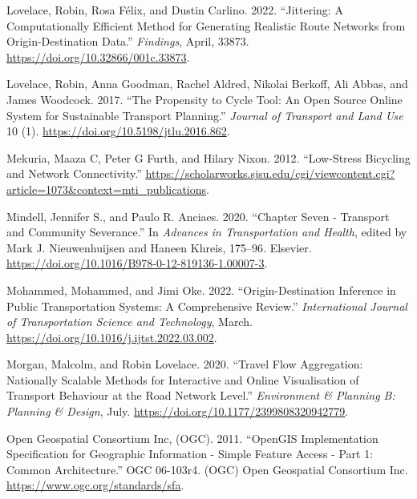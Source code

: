 \documentclass{isprs} %
\newlength{\cslhangindent}
\newlength{\cslentryspacingunit} %
\newenvironment{CSLReferences}[2] %
 {%
  \setlength{\parindent}{0pt}
  \ifodd #1
  \let\oldpar\par
  \def\par{\hangindent=\cslhangindent\oldpar}
  \fi
  \setlength{\parskip}{#2\cslentryspacingunit}
 }%
 {}
\begin{document}
\begin{CSLReferences}{1}{0}
\leavevmode{}%
Lovelace, Robin, Rosa Félix, and Dustin Carlino. 2022. {``Jittering: {A Computationally Efficient Method} for {Generating Realistic Route Networks} from {Origin-Destination Data}.''} \emph{Findings}, April, 33873. \url{https://doi.org/10.32866/001c.33873}.

\leavevmode{}%
Lovelace, Robin, Anna Goodman, Rachel Aldred, Nikolai Berkoff, Ali Abbas, and James Woodcock. 2017. {``The {Propensity} to {Cycle Tool}: {An} Open Source Online System for Sustainable Transport Planning.''} \emph{Journal of Transport and Land Use} 10 (1). \url{https://doi.org/10.5198/jtlu.2016.862}.

\leavevmode{}%
Mekuria, Maaza C, Peter G Furth, and Hilary Nixon. 2012. {``Low-Stress Bicycling and Network Connectivity.''} \url{https://scholarworks.sjsu.edu/cgi/viewcontent.cgi?article=1073\&context=mti_publications}.

\leavevmode{}%
Mindell, Jennifer S., and Paulo R. Anciaes. 2020. {``Chapter Seven - {Transport} and Community Severance.''} In \emph{Advances in {Transportation} and {Health}}, edited by Mark J. Nieuwenhuijsen and Haneen Khreis, 175--96. {Elsevier}. \url{https://doi.org/10.1016/B978-0-12-819136-1.00007-3}.

\leavevmode{}%
Mohammed, Mohammed, and Jimi Oke. 2022. {``Origin-Destination Inference in Public Transportation Systems: {A} Comprehensive Review.''} \emph{International Journal of Transportation Science and Technology}, March. \url{https://doi.org/10.1016/j.ijtst.2022.03.002}.

\leavevmode{}%
Morgan, Malcolm, and Robin Lovelace. 2020. {``Travel Flow Aggregation: Nationally Scalable Methods for Interactive and Online Visualisation of Transport Behaviour at the Road Network Level.''} \emph{Environment \& Planning B: Planning \& Design}, July. \url{https://doi.org/10.1177/2399808320942779}.

\leavevmode{}%
Open Geospatial Consortium Inc, (OGC). 2011. {``{OpenGIS Implementation Specification} for {Geographic} Information - {Simple} Feature Access - {Part} 1: {Common} Architecture.''} OGC 06-103r4. {(OGC) Open Geospatial Consortium Inc.} \url{https://www.ogc.org/standards/sfa}.


\end{CSLReferences}
\end{document}
